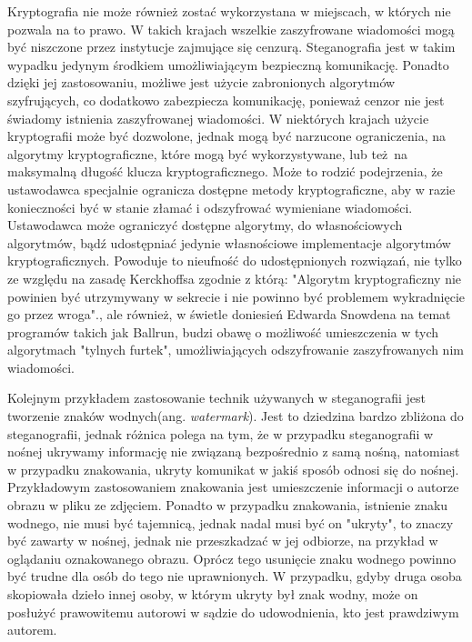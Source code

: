 \documentclass[a4paper, twoside, 12pt]{report}
\begin{document}
        Kryptografia nie może również zostać wykorzystana w miejscach, w których
        nie pozwala na to prawo.\cite{CRYPTOGRAFYLAW} W takich krajach wszelkie
        zaszyfrowane wiadomości mogą być niszczone przez instytucje zajmujące się
        cenzurą. Steganografia jest w takim
        wypadku jedynym środkiem umożliwiającym bezpieczną komunikację. Ponadto
        dzięki jej zastosowaniu, możliwe jest użycie zabronionych algorytmów szyfrujących,
        co dodatkowo zabezpiecza komunikację, ponieważ cenzor nie jest świadomy
        istnienia zaszyfrowanej wiadomości. W niektórych krajach użycie kryptografii
        może być dozwolone, jednak mogą być narzucone ograniczenia, na algorytmy
        kryptograficzne, które mogą być wykorzystywane, lub też na maksymalną
        długość klucza kryptograficznego. Może to rodzić podejrzenia, że ustawodawca
        specjalnie ogranicza dostępne metody kryptograficzne, aby w razie konieczności
        być w stanie złamać i odszyfrować wymieniane wiadomości. Ustawodawca
        może ograniczyć dostępne algorytmy, do własnościowych algorytmów, bądź
        udostępniać jedynie własnościowe implementacje algorytmów kryptograficznych.
        Powoduje to nieufność do udostępnionych rozwiązań, nie tylko ze względu
        na zasadę Kerckhoffsa zgodnie z którą:
        "Algorytm kryptograficzny nie powinien być utrzymywany w sekrecie i nie powinno
        być problemem wykradnięcie go przez wroga".\cite{KERCKHOS}, ale również,
        w świetle doniesień Edwarda Snowdena na temat programów takich jak
        Ballrun\cite{WIKI:BALLRUN}, budzi obawę o możliwość umieszczenia w tych
        algorytmach "tylnych furtek", umożliwiających odszyfrowanie zaszyfrowanych
        nim wiadomości.

        Kolejnym przykładem zastosowanie technik używanych w steganografii jest
        tworzenie znaków wodnych(ang. \emph{watermark}). Jest to dziedzina bardzo zbliżona do steganografii,
        jednak różnica polega na tym, że w przypadku steganografii w nośnej ukrywamy
        informację nie związaną bezpośrednio z samą nośną, natomiast w przypadku znakowania,
        ukryty komunikat w jakiś sposób odnosi się do nośnej. Przykładowym zastosowaniem
        znakowania jest umieszczenie informacji o autorze obrazu w pliku ze zdjęciem.
        Ponadto w przypadku znakowania, istnienie znaku wodnego, nie musi być tajemnicą,
        jednak nadal musi być on "ukryty", to znaczy być zawarty w nośnej, jednak
        nie przeszkadzać w jej odbiorze, na przykład w oglądaniu oznakowanego obrazu.
        Oprócz tego usunięcie znaku wodnego powinno być trudne dla osób do tego nie
        uprawnionych. W przypadku, gdyby druga osoba skopiowała dzieło innej osoby,
        w którym ukryty był znak wodny, może on posłużyć prawowitemu autorowi w
        sądzie do udowodnienia, kto jest prawdziwym autorem.
\end{document}
